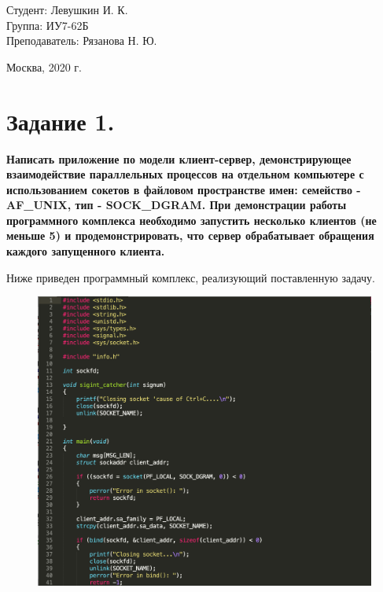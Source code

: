 \documentclass[a4paper,12pt]{article}
\begin{document}
	\large
	\begin{flushright}
		Студент: Левушкин И. К. \\
		Группа: ИУ7-62Б \\
		Преподаватель: Рязанова Н. Ю. \\
	\end{flushright}
	
	\vspace*{30mm}
	\begin{center}
		Москва, 2020 г.  
	\end{center}
	\thispagestyle{empty}
	
	
	\newpage
	
	\section*{Задание 1.}
	
	{\bf Написать приложение по модели клиент-сервер, демонстрирующее взаимодействие параллельных процессов на отдельном компьютере с использованием сокетов в файловом пространстве имен: семейство - AF\_UNIX, тип - SOCK\_DGRAM. При демонстрации работы программного комплекса необходимо запустить несколько клиентов (не меньше 5) и продемонстрировать, что сервер обрабатывает обращения каждого запущенного клиента.}
	
	Ниже приведен программный комплекс, реализующий поставленную задачу.
	
	\begin{figure}[h!]
		\begin{center}
			{\includegraphics[scale = 0.6]{server1_1.png}}
			\label{ris:server1_1}
		\end{center}
	\end{figure}
\end{document}
